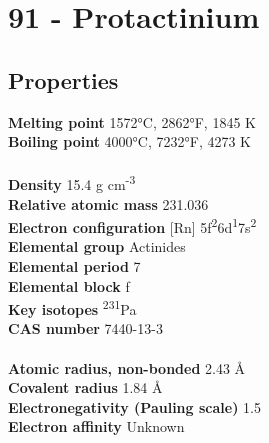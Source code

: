 \section{91 - Protactinium}
\label{sec:elem-protactinium}
\subsection{Properties}
\textbf{Melting point} 1572°C, 2862°F, 1845 K\\
\textbf{Boiling point} 4000°C, 7232°F, 4273 K\\
\\
\textbf{Density} 15.4 g cm\textsuperscript{-3}\\
\textbf{Relative atomic mass} 231.036\\
\textbf{Electron configuration} [Rn] 5f\textsuperscript{2}6d\textsuperscript{1}7s\textsuperscript{2}\\
\textbf{Elemental group} Actinides\\
\textbf{Elemental period} 7\\
\textbf{Elemental block} f\\
\textbf{Key isotopes} \textsuperscript{231}Pa\\
\textbf{CAS number} 7440-13-3\\
\\
\textbf{Atomic radius, non-bonded} 2.43 Å\\
\textbf{Covalent radius} 1.84 Å\\
\textbf{Electronegativity (Pauling scale)} 1.5\\
\textbf{Electron affinity} Unknown\\